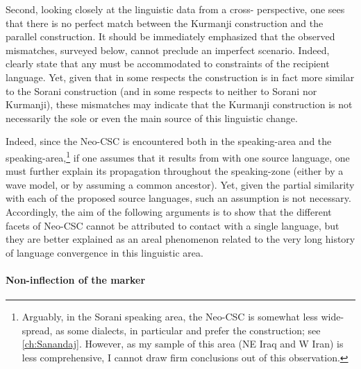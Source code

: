 Second, looking closely at the linguistic data from a cross- perspective, one sees that there is no perfect match between the Kurmanji construction and the parallel  construction. It should be immediately emphasized that the observed mismatches, surveyed below, cannot preclude an imperfect  scenario. Indeed, \citet[836]{MatrasSakel} clearly state that any  must be accommodated to constraints of the recipient language. Yet, given that in some respects the  construction is in fact more similar to the Sorani \ez* construction (and in some respects to neither to Sorani nor Kurmanji), these mismatches may indicate that the Kurmanji \ez* construction is not necessarily  the sole or even the main source of this linguistic change. 

Indeed, since the Neo-CSC is encountered both in the \Kur speaking-area and the \Sor speaking-area,\footnote{Arguably, in the Sorani speaking area, the Neo-CSC is somewhat less wide-spread, as some dialects, in particular \JSan and \JSul prefer the  construction; see \cref{ch:Sanandaj}. However, as my sample of this area (NE Iraq and W Iran) is less comprehensive, I cannot draw firm conclusions out of this observation.}
 if one assumes that it results from  with one source language, one must further explain its propagation throughout the  speaking-zone (either by a wave model, or by assuming a common ancestor). Yet, given the partial similarity with each of the proposed source languages, such an assumption is not necessary. Accordingly, the aim of the following arguments is to show that the different facets of Neo-CSC cannot be attributed to contact with a single language, but they are better explained as an areal phenomenon related to the very long history of language convergence in this linguistic area.

\paragraph{Non-inflection of the  \cst* marker} \label{ss:infl_lnk}
 
